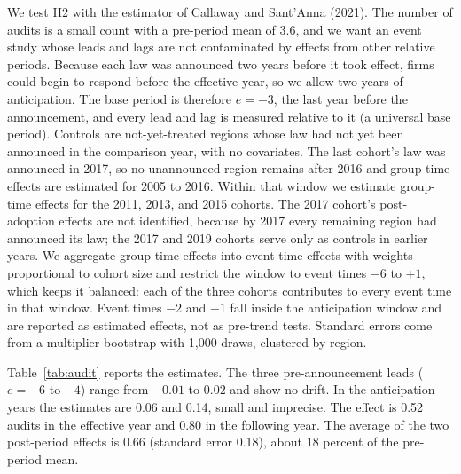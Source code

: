\documentclass[11pt]{article}
\begin{document}
We test H2 with the estimator of Callaway and Sant'Anna (2021). The number of audits is a small count with a pre-period mean of 3.6, and we want an event study whose leads and lags are not contaminated by effects from other relative periods. Because each law was announced two years before it took effect, firms could begin to respond before the effective year, so we allow two years of anticipation. The base period is therefore $e = -3$, the last year before the announcement, and every lead and lag is measured relative to it (a universal base period). Controls are not-yet-treated regions whose law had not yet been announced in the comparison year, with no covariates. The last cohort's law was announced in 2017, so no unannounced region remains after 2016 and group-time effects are estimated for 2005 to 2016. Within that window we estimate group-time effects for the 2011, 2013, and 2015 cohorts. The 2017 cohort's post-adoption effects are not identified, because by 2017 every remaining region had announced its law; the 2017 and 2019 cohorts serve only as controls in earlier years. We aggregate group-time effects into event-time effects with weights proportional to cohort size and restrict the window to event times $-6$ to $+1$, which keeps it balanced: each of the three cohorts contributes to every event time in that window. Event times $-2$ and $-1$ fall inside the anticipation window and are reported as estimated effects, not as pre-trend tests. Standard errors come from a multiplier bootstrap with 1,000 draws, clustered by region.

Table~\ref{tab:audit} reports the estimates. The three pre-announcement leads ($e = -6$ to $-4$) range from $-0.01$ to $0.02$ and show no drift. In the anticipation years the estimates are 0.06 and 0.14, small and imprecise. The effect is 0.52 audits in the effective year and 0.80 in the following year. The average of the two post-period effects is 0.66 (standard error 0.18), about 18 percent of the pre-period mean.
\end{document}
